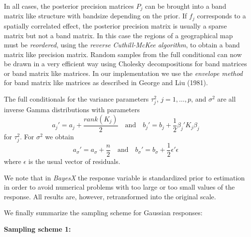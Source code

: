 In all cases, the posterior precision matrices $P_j$ can be
brought into a band matrix like structure with bandsize depending
on the prior. If $f_j$ corresponds to a spatially correlated
effect, the posterior precision matrix is usually a sparse matrix
but not a band matrix. In this case the regions of a geographical
map must be {\em reordered}, using the {\em reverse Cuthill-McKee
algorithm}, to obtain a band matrix like precision matrix. Random
samples from the full conditional can now be drawn in a very
efficient way using Cholesky decompositions for band matrices or
band matrix like matrices. In our implementation we use the {\em
envelope method} for band matrix like matrices as described in
George and Liu (1981).

The full conditionals for the variance parameters $\tau^2_j$,
$j=1,\dots,p$, and $\sigma^2$ are all inverse Gamma distributions
with parameters
\begin{equation}
\label{hypab} a_j' = a_j + \frac{rank(K_j)}{2} \quad \mbox{and}
\quad b_j' = b_j + \frac{1}{2} \beta_j'K_j \beta_j
\end{equation}
for $\tau^2_j$. For $\sigma^2$ we obtain
\begin{equation}
\label{hypabsigma} a_{\sigma}' = a_{\sigma}+\frac{n}{2} \quad
\mbox{and} \quad b_{\sigma}' = b_{\sigma} + \frac{1}{2}
\epsilon'\epsilon
\end{equation}
where $\epsilon$ is the usual vector of residuals.

We note that in {\em BayesX} the response variable is standardized
prior to estimation in order to avoid numerical problems with too
large or too small values of the response. All results are,
however, retransformed into the original scale.

We finally summarize the sampling scheme for Gaussian responses:

{\bf Sampling scheme 1:}

